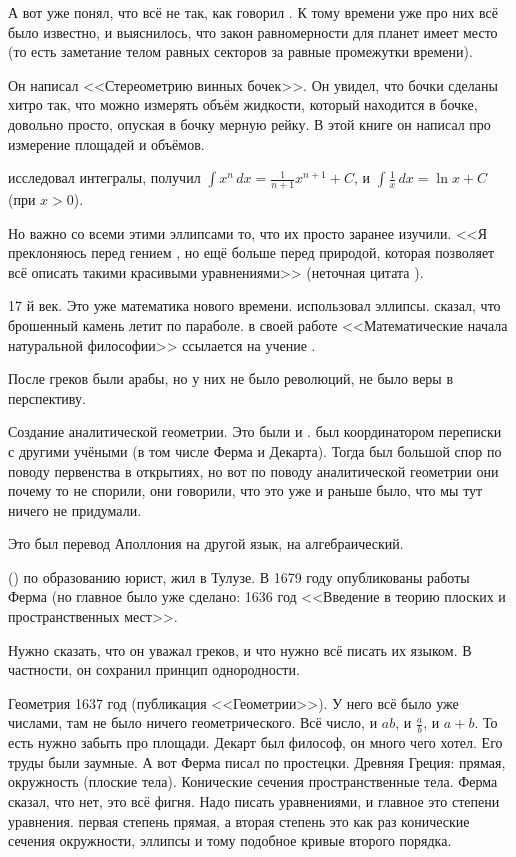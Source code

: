 \documentclass[a4paper,oneside,fleqn,10pt]{article}
\begin{document}
А вот  уже понял, что всё не так, как говорил
.  К тому времени уже про них всё было известно, и
выяснилось, что закон равномерности для планет имеет место (то есть
заметание телом равных секторов за равные промежутки времени).

Он написал <<Стереометрию винных бочек>>. Он увидел, что бочки сделаны
хитро так, что можно измерять объём жидкости, который находится в
бочке, довольно просто, опуская в бочку мерную рейку.  В этой книге он
написал про измерение площадей и объёмов.

 исследовал интегралы, получил $\int x^n\,dx =
\frac{1}{n+1} x^{n+1} + C$, и $ \int \frac1x\,dx = \ln x + C$ (при $x
> 0$).

Но важно со всеми этими эллипсами то, что их просто заранее изучили.
<<Я преклоняюсь перед гением , но ещё больше
перед природой, которая позволяет всё описать такими красивыми
уравнениями>> (неточная цитата ).

17 й век. Это уже математика нового времени.  использовал
эллипсы.  сказал, что брошенный камень летит по
параболе.  в своей работе <<Математические начала
натуральной философии>> ссылается на учение
.

После греков были арабы, но у них не было революций, не было веры в
перспективу.

Создание аналитической геометрии. Это были  и
.   был координатором переписки с другими
учёными (в том числе Ферма и Декарта).  Тогда был большой спор по
поводу первенства в открытиях, но вот по поводу аналитической
геометрии они почему то не спорили, они говорили, что это уже и раньше
было, что мы тут ничего не придумали.

Это был перевод Аполлония на другой язык, на алгебраический.

 () по образованию
юрист, жил в Тулузе.  В 1679 году опубликованы работы Ферма (но
главное было уже сделано: 1636 год <<Введение в теорию плоских и
пространственных мест>>.

Нужно сказать, что он уважал греков, и что нужно всё писать их языком.
В частности, он сохранил принцип однородности.

Геометрия  1637 год (публикация <<Геометрии>>).
У него всё было уже числами, там не было ничего геометрического.  Всё
число, и $ab$, и $\frac ab$, и $a+b$. То есть нужно забыть про
площади.  Декарт был философ, он много чего хотел. Его труды были
заумные.  А вот Ферма писал по простецки. Древняя Греция: прямая,
окружность (плоские тела).  Конические сечения пространственные
тела. Ферма сказал, что нет, это всё фигня. Надо писать уравнениями, и
главное это степени уравнения.  первая степень прямая, а вторая
степень это как раз конические сечения окружности, эллипсы и тому
подобное кривые второго порядка.
\end{document}
